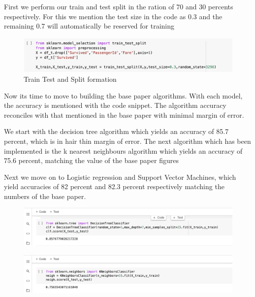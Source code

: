 \documentclass[12pt]{article}
\newcommand{\nd}{\noindent}
\begin{document}
\nd First we perform our train and test split in the ration of 70 and 30 percents respectively. For this we mention the test size in the code as 0.3 and the remaining 0.7 will automatically be reserved for training 

\begin{center}
\begin{figure}[h]
\centerline{\includegraphics[scale=.55]{1.png}}
\caption{Train Test and Split formation}
\end{figure}
\end{center}

\nd Now its time to move to building the base paper algorithms. With each model, the accuracy is mentioned with the code snippet. The algorithm accuracy reconciles with that mentioned in the base paper with minimal margin of error. 

\nd We start with the decision tree algorithm which yields an accuracy of 85.7 percent, which is in hair thin margin of error. The next algorithm which has been implemented is the k nearest neighbours algorithm which yields an accuracy of 75.6 percent, matching the value of the base paper figures 

\newpage 
\nd Next we move on to Logistic regression and Support Vector Machines, which yield accuracies of 82 percent and 82.3 percent respectively matching the numbers of the base paper. 

\vspace{10mm}
\hspace{-5mm}
\begin{figure}[h]
\centering
\begin{minipage}{.5\textwidth}
  \centering
  \includegraphics[width=1.4\linewidth]{dt.png}
  \label{fig:test1}
\end{minipage}%
\begin{minipage}{.5\textwidth}
  \centering
  \includegraphics[width=1.4\linewidth]{kn.png}
  \label{fig:test2}
\end{minipage}
\end{figure}
\end{document}
